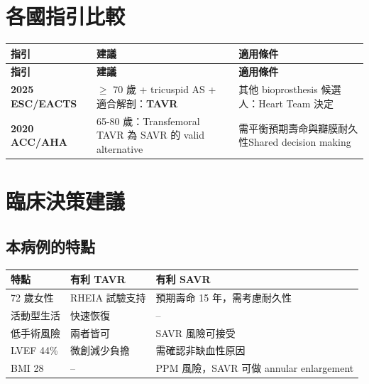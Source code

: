 \documentclass[12pt,a4paper]{article}
\begin{document}
\section{各國指引比較}

\begin{longtable}{p{3cm}p{5.5cm}p{5.5cm}}
\toprule
\textbf{指引} & \textbf{建議} & \textbf{適用條件} \\
\midrule
\endfirsthead
\toprule
\textbf{指引} & \textbf{建議} & \textbf{適用條件} \\
\midrule
\endhead
\bottomrule
\endfoot
\textbf{2025 ESC/EACTS} & $\geq$ 70 歲 + tricuspid AS + 適合解剖：\textcolor{emergency_blue}{\textbf{TAVR}} & 其他 bioprosthesis 候選人：Heart Team 決定 \\
\midrule
\textbf{2020 ACC/AHA} & 65-80 歲：\newline Transfemoral TAVR 為 SAVR 的 valid alternative & 需平衡預期壽命與瓣膜耐久性\newline Shared decision making \\
\bottomrule
\end{longtable}


\section{臨床決策建議}

\subsection{本病例的特點}

\begin{longtable}{p{4cm}p{5cm}p{5cm}}
\toprule
\textbf{特點} & \textbf{有利 TAVR} & \textbf{有利 SAVR} \\
\midrule
\endfirsthead
72 歲女性 & RHEIA 試驗支持 & 預期壽命 15 年，需考慮耐久性 \\
\midrule
活動型生活 & 快速恢復 & -- \\
\midrule
低手術風險 & 兩者皆可 & SAVR 風險可接受 \\
\midrule
LVEF 44\% & 微創減少負擔 & 需確認非缺血性原因 \\
\midrule
BMI 28 & -- & PPM 風險，SAVR 可做 annular enlargement \\
\bottomrule
\end{longtable}
\end{document}
